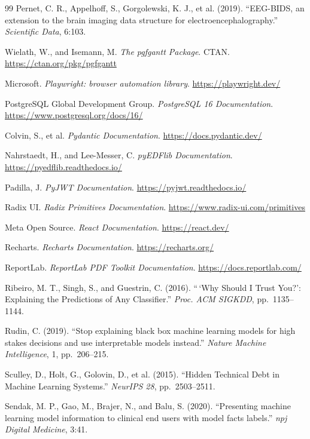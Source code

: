 \documentclass[11pt,a4paper]{article}
\begin{document}
{\begin{thebibliography}{99}
 Pernet, C. R., Appelhoff, S., Gorgolewski, K. J., et al. (2019). ``EEG-BIDS, an extension to the brain imaging data structure for electroencephalography.'' \emph{Scientific Data}, 6:103.

 Wielath, W., and Isemann, M. \emph{The pgfgantt Package}. CTAN. \url{https://ctan.org/pkg/pgfgantt}

 Microsoft. \emph{Playwright: browser automation library}. \url{https://playwright.dev/}

 PostgreSQL Global Development Group. \emph{PostgreSQL 16 Documentation}. \url{https://www.postgresql.org/docs/16/}

 Colvin, S., et al. \emph{Pydantic Documentation}. \url{https://docs.pydantic.dev/}

 Nahrstaedt, H., and Lee-Messer, C. \emph{pyEDFlib Documentation}. \url{https://pyedflib.readthedocs.io/}

 Padilla, J. \emph{PyJWT Documentation}. \url{https://pyjwt.readthedocs.io/}

 Radix UI. \emph{Radix Primitives Documentation}. \url{https://www.radix-ui.com/primitives}

 Meta Open Source. \emph{React Documentation}. \url{https://react.dev/}

 Recharts. \emph{Recharts Documentation}. \url{https://recharts.org/}

 ReportLab. \emph{ReportLab PDF Toolkit Documentation}. \url{https://docs.reportlab.com/}

 Ribeiro, M. T., Singh, S., and Guestrin, C. (2016). ``\,`Why Should I Trust You?': Explaining the Predictions of Any Classifier.'' \emph{Proc. ACM SIGKDD}, pp.~1135--1144.

 Rudin, C. (2019). ``Stop explaining black box machine learning models for high stakes decisions and use interpretable models instead.'' \emph{Nature Machine Intelligence}, 1, pp.~206--215.

 Sculley, D., Holt, G., Golovin, D., et al. (2015). ``Hidden Technical Debt in Machine Learning Systems.'' \emph{NeurIPS 28}, pp.~2503--2511.

 Sendak, M. P., Gao, M., Brajer, N., and Balu, S. (2020). ``Presenting machine learning model information to clinical end users with model facts labels.'' \emph{npj Digital Medicine}, 3:41.


\end{thebibliography}}
\end{document}
